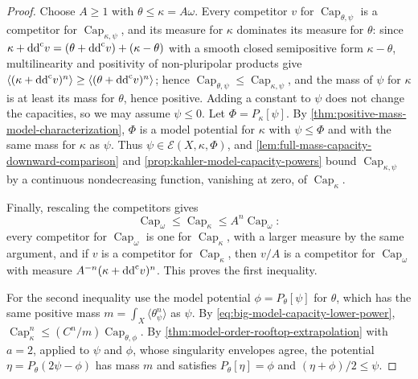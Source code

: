 \begin{proof}
Choose $A\geq1$ with $\theta\leq\kappa=A\omega$. Every competitor $v$ for $\operatorname{Cap}_{\theta,\psi}$ is a competitor for $\operatorname{Cap}_{\kappa,\psi}$, and its measure for $\kappa$ dominates its measure for $\theta$: since $\kappa+\mathrm{dd}^{\mathrm{c}} v=(\theta+\mathrm{dd}^{\mathrm{c}} v)+(\kappa-\theta)$ with a smooth closed semipositive form $\kappa-\theta$, multilinearity and positivity of non-pluripolar products give $\langle(\kappa+\mathrm{dd}^{\mathrm{c}} v)^n\rangle\geq\langle(\theta+\mathrm{dd}^{\mathrm{c}} v)^n\rangle$; hence $\operatorname{Cap}_{\theta,\psi}\leq\operatorname{Cap}_{\kappa,\psi}$, and the mass of $\psi$ for $\kappa$ is at least its mass for $\theta$, hence positive. Adding a constant to $\psi$ does not change the capacities, so we may assume $\psi\leq0$. Let $\Phi=P_\kappa[\psi]$. By \cref{thm:positive-mass-model-characterization}, $\Phi$ is a model potential for $\kappa$ with $\psi\leq\Phi$ and with the same mass for $\kappa$ as $\psi$. Thus $\psi\in\mathcal E(X,\kappa,\Phi)$, and \cref{lem:full-mass-capacity-downward-comparison} and \cref{prop:kahler-model-capacity-powers} bound $\operatorname{Cap}_{\kappa,\psi}$ by a continuous nondecreasing function, vanishing at zero, of $\operatorname{Cap}_\kappa$.

Finally, rescaling the competitors gives
\[
 \operatorname{Cap}_\omega\leq\operatorname{Cap}_\kappa
                              \leq A^n\operatorname{Cap}_\omega:
\]
every competitor for $\operatorname{Cap}_\omega$ is one for $\operatorname{Cap}_\kappa$, with a larger measure by the same argument, and if $v$ is a competitor for $\operatorname{Cap}_\kappa$, then $v/A$ is a competitor for $\operatorname{Cap}_\omega$ with measure $A^{-n}(\kappa+\mathrm{dd}^{\mathrm{c}} v)^n$. This proves the first inequality.

For the second inequality use the model potential $\phi=P_\theta[\psi]$ for $\theta$, which has the same positive mass $m=\int_X\langle\theta_\psi^n\rangle$ as $\psi$. By \eqref{eq:big-model-capacity-lower-power}, $\operatorname{Cap}_\kappa^n\leq(C^n/m)\operatorname{Cap}_{\theta,\phi}$. By \cref{thm:model-order-rooftop-extrapolation} with $a=2$, applied to $\psi$ and $\phi$, whose singularity envelopes agree, the potential $\eta=P_\theta(2\psi-\phi)$ has mass $m$ and satisfies $P_\theta[\eta]=\phi$ and $(\eta+\phi)/2\leq\psi$.


\end{proof}
